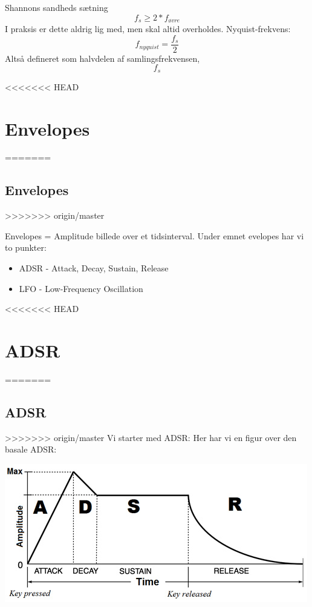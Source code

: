\documentclass[12pt, letterpaper]{article}
\begin{document}
Shannons sandheds sætning
$$f_s\geq 2*f_{øvre}$$
I praksis er dette aldrig lig med, men skal altid overholdes. 
Nyquist-frekvens:
$$f_{nyquist} = \frac{f_s}{2}$$
Altså defineret som halvdelen af samlingsfrekvensen, $$f_s$$

<<<<<<< HEAD
\section{Envelopes}
=======
\subsection{Envelopes}
>>>>>>> origin/master

Envelopes = Amplitude billede over et tidsinterval. 
Under emnet evelopes har vi to punkter: 
\begin{itemize}
\item ADSR - Attack, Decay, Sustain, Release
\item LFO - Low-Frequency Oscillation
\end{itemize}

<<<<<<< HEAD
\section{ADSR}
=======
\subsection{ADSR}
>>>>>>> origin/master
Vi starter med ADSR: 
Her har vi en figur over den basale ADSR: 

\begin{center}
\includegraphics[width=\textwidth]{billeder/ADSR}
\end{center}
\end{document}
